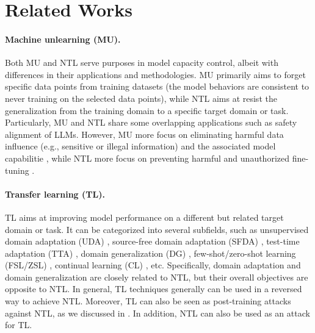 
\section{Related Works}
\label{sec:related}



\paragraph{Machine unlearning (MU).}
Both MU \cite{bourtoule2021machine,nguyen2022survey,qu2023learn,xu2023machine,zhu2024decoupling,wang2024unlearning} and NTL serve purposes in model capacity control, albeit with  differences in their applications and methodologies. 
MU primarily aims to forget specific data points
from training datasets \cite{xu2023machine,rosati2024representation} (the model behaviors are consistent to never training on the selected data points), while NTL aims at resist the generalization from the training domain to a specific target domain or task. Particularly, MU and NTL share some overlapping applications such as safety alignment of LLMs. However, MU more focus on eliminating harmful data influence (e.g., sensitive or illegal information) and the associated model capabilitie \cite{barez2025open,maini2024tofu}, while NTL more focus on preventing harmful and unauthorized fine-tuning \cite{huang2024harmful}. 


\paragraph{Transfer learning (TL).} TL \cite{zhuang2020comprehensive} aims at improving model performance on a different but related target domain or task. It can be categorized into several subfields, such as unsupervised domain adaptation (UDA) \cite{long2016unsupervised,venkateswara2017deep,kang2019contrastive,liu2022deep}, source-free domain adaptation (SFDA) \cite{liang2020we,liang2021source,tang2024sourcefree,tang2024unified}, test-time adaptation (TTA) \cite{chen2022contrastive,liang2025comprehensive}, domain generalization (DG) \cite{wang2022generalizing,ye2023coping,huang2023robust}, few-shot/zero-shot learning (FSL/ZSL) \cite{xian2018zero,chen2022transzero,chen2024causal,chen2024rethinking,hou2024visual}, continual learning (CL) \cite{lopez2017gradient,zenke2017continual,wang2022improving,wang2024comprehensive}, etc. 
Specifically, domain adaptation and domain generalization are closely related to NTL, but their overall objectives are opposite to NTL. In general, TL techniques generally can be used in a reversed way to achieve NTL. Moreover, TL can also be seen as post-training attacks against NTL, as we discussed in . In addition, NTL can also be used as an attack for TL.
